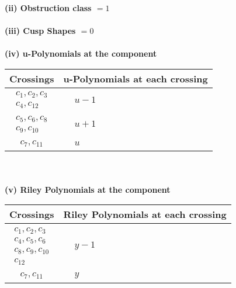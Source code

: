 \documentclass[1p]{elsarticle_modified}
\theoremstyle{definition}
\begin{document}
\flushleft \textbf{(ii) Obstruction class $= 1$}\\~\\
\flushleft \textbf{(iii) Cusp Shapes $= 0$}\\~\\
\newpage\renewcommand{\arraystretch}{1}
\flushleft \textbf{(iv) u-Polynomials at the component}\newline \\
\begin{tabular}{m{50pt}|m{274pt}}
Crossings & \hspace{64pt}u-Polynomials at each crossing \\
\hline $$\begin{aligned}c_{1},c_{2},c_{3}\\c_{4},c_{12}\end{aligned}$$&$\begin{aligned}
&u-1
\end{aligned}$\\
\hline $$\begin{aligned}c_{5},c_{6},c_{8}\\c_{9},c_{10}\end{aligned}$$&$\begin{aligned}
&u+1
\end{aligned}$\\
\hline $$\begin{aligned}c_{7},c_{11}\end{aligned}$$&$\begin{aligned}
&u
\end{aligned}$\\
\hline
\end{tabular}\\~\\
\newpage\renewcommand{\arraystretch}{1}
\flushleft \textbf{(v) Riley Polynomials at the component}\newline \\
\begin{tabular}{m{50pt}|m{274pt}}
Crossings & \hspace{64pt}Riley Polynomials at each crossing \\
\hline $$\begin{aligned}c_{1},c_{2},c_{3}\\c_{4},c_{5},c_{6}\\c_{8},c_{9},c_{10}\\c_{12}\end{aligned}$$&$\begin{aligned}
&y-1
\end{aligned}$\\
\hline $$\begin{aligned}c_{7},c_{11}\end{aligned}$$&$\begin{aligned}
&y
\end{aligned}$\\
\hline
\end{tabular}\\~\\
\end{document}
